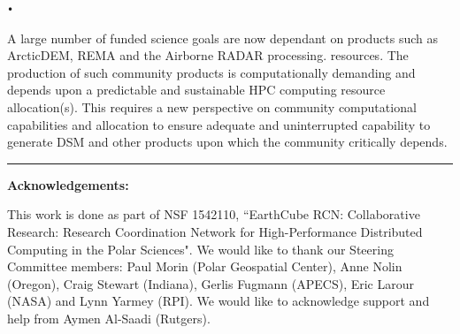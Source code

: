 \texttt{•}\documentclass[10pt,letterpaper,draft]{article}
\begin{document}
\begin{description}[style=unboxed]
\item[ 5. Predictable and Sustainable Computing Allocation]
A large number of funded science goals are now dependant on products such as ArcticDEM, REMA and the Airborne RADAR processing.  resources.   The production of such community products is computationally demanding and depends upon a predictable and sustainable HPC computing resource allocation(s). This requires a new perspective on community computational capabilities and allocation to ensure adequate and uninterrupted capability to generate DSM and other products upon which the community critically depends. 

\end{description}



\hspace{1.5cm}\rule{13.0cm}{0.8pt}

\vspace{0.5cm}

{\noindent \bf \small Acknowledgements:}  

This work is done as part of NSF 1542110, ``EarthCube RCN: Collaborative
Research: Research Coordination Network for High-Performance Distributed
Computing in the Polar Sciences". We would like to thank our Steering
Committee members: Paul Morin (Polar Geospatial Center), Anne Nolin (Oregon),
Craig Stewart (Indiana), Gerlis Fugmann (APECS), Eric Larour (NASA) and Lynn
Yarmey (RPI). We would like to acknowledge support and help from Aymen
Al-Saadi (Rutgers).




~\nocite{xsede_training}
~\nocite{NRT}
~\nocite{Allen2011-qx}
~\nocite{Wilson2014-pc}
~\nocite{mattmann2015}
~\nocite{Workshop2014}
~\nocite{IGERT}
~\nocite{Wilson_undated-yk}
~\nocite{Datacarpentry_undated-zl}
~\nocite{Prasad2011-dd}
~\nocite{science_hack_day}
~\nocite{Laws2007-dj}
~\nocite{Neeman2008-mj}
~\nocite{Polar-HPC_hackathon}
~\nocite{Neeman2016-uz}
~\nocite{Reerink2016-xr}
~\nocite{FutureScape}
~\nocite{Neeman2002-dk}
~\nocite{Anslow2016-vf}
~\nocite{Skytland2016-jk}
~\nocite{Space_apps}
~\nocite{Smart_communities_hackathon}
~\nocite{Kennicutt2016-hn}
~\nocite{Leckart2015-go}
~\nocite{Open_data_hackathon}
~\nocite{xsede_website}
~\nocite{Hacking_medicin}
~\nocite{Fakhri2016-pm}
~\nocite{Nelson2007}
~\nocite{HPC_Carpentry}
~\nocite{National2006}
~\nocite{bloom}
~\nocite{bloom-vanderbilt}


\end{document}
